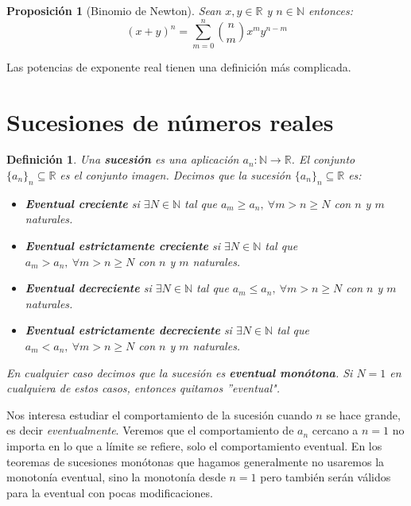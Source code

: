 \documentclass{article}
\newtheorem{prop}{Proposición}
\newtheorem{define}{Definición}
\begin{document}
\begin{prop}[Binomio de Newton]
Sean $x,y \in \mathbb{R}$ y $n \in \mathbb{N}$ entonces:
\begin{equation}
(x + y)^n = \sum_{m=0}^{n} {n \choose m} x^m y^{n-m}
\end{equation}
\end{prop}

Las potencias de exponente real tienen una definición más complicada.







\newpage
\section{Sucesiones de números reales}
\begin{define}
	Una \textbf{sucesión} es una aplicación $a_n: \mathbb{N} \rightarrow \mathbb{R}$. El conjunto $\{a_n\}_n \subseteq \mathbb{R}$ es el conjunto imagen. Decimos que la sucesión
	$\{a_n\}_n \subseteq \mathbb{R}$ es:
	\begin{itemize}
		\item
		\textbf{Eventual creciente} si $\exists N \in \mathbb{N}$ tal que $a_m \geq a_n,\ \forall m>n\geq N$ con $n$ y $m$ naturales.
		\item
		\textbf{Eventual estrictamente creciente} si $\exists N \in \mathbb{N}$ tal que $a_m > a_n,\ \forall m>n\geq N$ con $n$ y $m$ naturales.
		\item
		\textbf{Eventual decreciente} si $\exists N \in \mathbb{N}$ tal que $a_m \leq a_n,\ \forall m>n\geq N$ con $n$ y $m$ naturales.
		\item
		\textbf{Eventual estrictamente decreciente} si $\exists N \in \mathbb{N}$ tal que $a_m < a_n,\ \forall m>n\geq N$ con $n$ y $m$ naturales.
	\end{itemize}
	En cualquier caso decimos que la sucesión es \textbf{eventual monótona}. Si $N = 1$ en cualquiera de estos casos, entonces quitamos ''eventual".
\end{define}
Nos interesa estudiar el comportamiento de la sucesión cuando $n$ se hace grande, es decir \textit{eventualmente}. Veremos que el comportamiento de $a_n$ cercano a $n = 1$ no importa
en lo que a límite se refiere, solo el comportamiento eventual. En los teoremas de sucesiones monótonas que hagamos generalmente no usaremos la monotonía eventual, sino la monotonía desde $n = 1$ pero también serán válidos para la eventual con pocas modificaciones.
\end{document}
